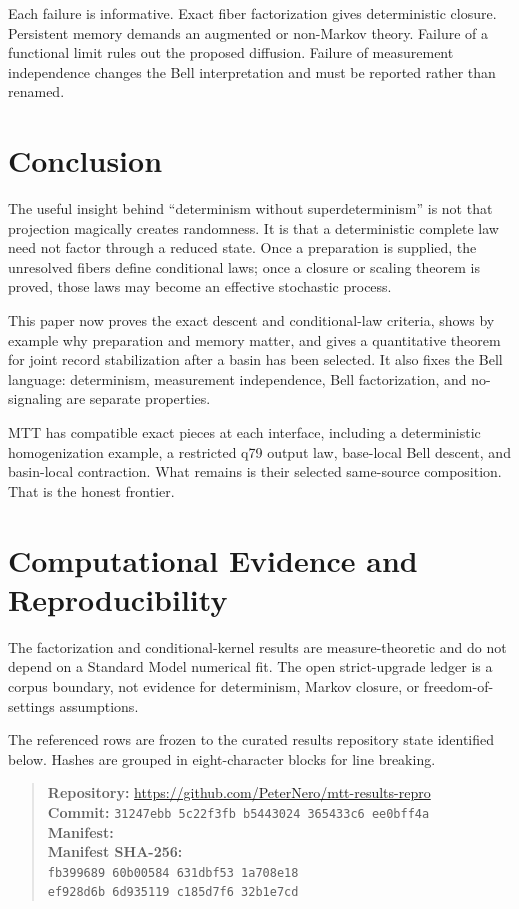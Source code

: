 \documentclass[11pt]{article}
\begin{document}
Each failure is informative. Exact fiber factorization gives deterministic
closure. Persistent memory demands an augmented or non-Markov theory. Failure
of a functional limit rules out the proposed diffusion. Failure of
measurement independence changes the Bell interpretation and must be
reported rather than renamed.

\section{Conclusion}

The useful insight behind ``determinism without superdeterminism'' is not that
projection magically creates randomness. It is that a deterministic complete
law need not factor through a reduced state. Once a preparation is supplied,
the unresolved fibers define conditional laws; once a closure or scaling
theorem is proved, those laws may become an effective stochastic process.

This paper now proves the exact descent and conditional-law criteria, shows
by example why preparation and memory matter, and gives a quantitative theorem
for joint record stabilization after a basin has been selected. It also fixes
the Bell language: determinism, measurement independence, Bell
factorization, and no-signaling are separate properties.

MTT has compatible exact pieces at each interface, including a deterministic
homogenization example, a restricted q79 output law, base-local Bell descent,
and basin-local contraction. What remains is their selected same-source
composition. That is the honest frontier.

\section*{Computational Evidence and Reproducibility}
The factorization and conditional-kernel results are measure-theoretic and do not depend on a Standard Model numerical fit. The open strict-upgrade ledger is a corpus boundary, not evidence for determinism, Markov closure, or freedom-of-settings assumptions.

The referenced rows are frozen to the curated results repository state identified below. Hashes are grouped in eight-character blocks for line breaking.
\begin{quote}\small
\textbf{Repository:} \url{https://github.com/PeterNero/mtt-results-repro}\\
\textbf{Commit:} \texttt{31247ebb 5c22f3fb b5443024 365433c6 ee0bff4a}\\
\textbf{Manifest:} \\
\textbf{Manifest SHA-256:}\\
\texttt{fb399689 60b00584 631dbf53 1a708e18}\\
\texttt{ef928d6b 6d935119 c185d7f6 32b1e7cd}
\end{quote}
\end{document}
